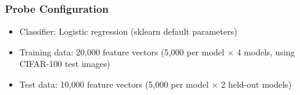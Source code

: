 \subsubsection{Probe Configuration}

\begin{itemize}
\item Classifier: Logistic regression (sklearn default parameters)
\item Training data: 20,000 feature vectors (5,000 per model $\times$ 4 models, using CIFAR-100 test images)
\item Test data: 10,000 feature vectors (5,000 per model $\times$ 2 held-out models)
\end{itemize}


